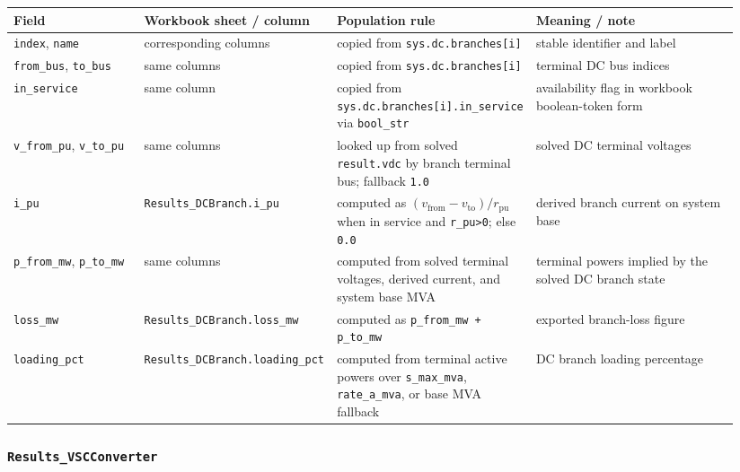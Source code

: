 \begin{longtable}{@{}L{0.18\linewidth}L{0.26\linewidth}L{0.22\linewidth}L{0.28\linewidth}@{}}
\toprule
Field & Workbook sheet / column & Population rule & Meaning / note \\
\midrule
\endhead
\texttt{index}, \texttt{name} & corresponding columns & copied from \texttt{sys.dc.branches[i]} & stable identifier and label \\
\texttt{from\_bus}, \texttt{to\_bus} & same columns & copied from \texttt{sys.dc.branches[i]} & terminal DC bus indices \\
\texttt{in\_service} & same column & copied from \texttt{sys.dc.branches[i].in\_service} via \texttt{bool\_str} & availability flag in workbook boolean-token form \\
\texttt{v\_from\_pu}, \texttt{v\_to\_pu} & same columns & looked up from solved \texttt{result.vdc} by branch terminal bus; fallback \texttt{1.0} & solved DC terminal voltages \\
\texttt{i\_pu} & \texttt{Results\_DCBranch.i\_pu} & computed as \((v_{\mathrm{from}}-v_{\mathrm{to}})/r_{\mathrm{pu}}\) when in service and \texttt{r\_pu>0}; else \texttt{0.0} & derived branch current on system base \\
\texttt{p\_from\_mw}, \texttt{p\_to\_mw} & same columns & computed from solved terminal voltages, derived current, and system base MVA & terminal powers implied by the solved DC branch state \\
\texttt{loss\_mw} & \texttt{Results\_DCBranch.loss\_mw} & computed as \texttt{p\_from\_mw + p\_to\_mw} & exported branch-loss figure \\
\texttt{loading\_pct} & \texttt{Results\_DCBranch.loading\_pct} & computed from terminal active powers over \texttt{s\_max\_mva}, \texttt{rate\_a\_mva}, or base MVA fallback & DC branch loading percentage \\
\bottomrule
\end{longtable}

\subsubsection*{\texttt{Results\_VSCConverter}}

